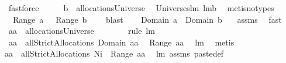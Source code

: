 \begin{isabellebody}
\ fastforce\ \isamarkupfalse%
\ \isamarkupfalse%
\ \isanewline
{}{\isacharcolon}\ {\isachardoublequoteopen}{\isacharquery}b\ {\isasymin}\ allocationsUniverse{\isachardoublequoteclose}\ \isamarkupfalse%
\ Universes{\isachardot}lm{}{}\ lm{}{}b\ \isamarkupfalse%
\ {\isacharparenleft}metis{\isacharparenleft}no{\isacharunderscore}types{\isacharparenright}{\isacharparenright}\ \isamarkupfalse%
\ \isanewline
{}{\isacharcolon}\ {\isachardoublequoteopen}{\isasymUnion}\ Range\ a\ {\isasyminter}\ {\isasymUnion}\ {\isacharparenleft}Range\ {\isacharquery}b{\isacharparenright}\ {\isacharequal}\ {\isacharbraceleft}{\isacharbraceright}{\isachardoublequoteclose}\ \isamarkupfalse%
\ blast\ \isamarkupfalse%
\ \isanewline
{}{\isacharcolon}\ {\isachardoublequoteopen}Domain\ a\ {\isasyminter}\ Domain\ {\isacharquery}b\ {\isacharequal}{\isacharbraceleft}{\isacharbraceright}{\isachardoublequoteclose}\ \isamarkupfalse%
\ assms\ \isamarkupfalse%
\ fast\isanewline
{}\isamarkupfalse%
\ {\isachardoublequoteopen}{\isacharquery}aa\ {\isasymin}\ allocationsUniverse{\isachardoublequoteclose}\ \isamarkupfalse%
\ {}\ {}\ {}\ {}\ \isamarkupfalse%
\ {\isacharparenleft}rule\ lm{}{}{\isacharparenright}\isanewline
{}\isamarkupfalse%
\ \isamarkupfalse%
\ {\isachardoublequoteopen}{\isacharquery}aa\ {\isasymin}\ allStrictAllocations{\isacharprime}{\isacharprime}{\isacharprime}\ {\isacharparenleft}Domain\ {\isacharquery}aa{\isacharparenright}\ \isanewline
{\isacharparenleft}{\isasymUnion}\ Range\ {\isacharquery}aa{\isacharparenright}{\isachardoublequoteclose}\ \isamarkupfalse%
\ lm{}{}\ \isamarkupfalse%
\ metis\ \isamarkupfalse%
\ \isamarkupfalse%
\ \isanewline
{\isachardoublequoteopen}{\isacharquery}aa\ {\isasymin}\ allStrictAllocations{\isacharprime}{\isacharprime}{\isacharprime}\ {\isacharparenleft}N{\isasymunion}{\isacharbraceleft}{\isacharquery}i{\isacharbraceright}{\isacharparenright}\ {\isacharparenleft}{\isasymUnion}\ Range\ {\isacharquery}aa{\isacharparenright}{\isachardoublequoteclose}\ \isamarkupfalse%
\ lm{}{}\ assms\ paste{\isacharunderscore}def\ \isamarkupfalse%

\end{isabellebody}
